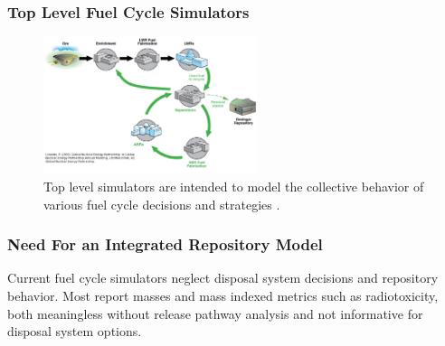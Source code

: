 

\begin{frame}[ctb!]
  \frametitle{Top Level Fuel Cycle Simulators}
  \begin{figure}[htbp!]
    \begin{center}
      \includegraphics[height=4cm]{simulations.eps}
    \end{center}
    \caption{Top level simulators are intended to model the collective 
    behavior of various fuel cycle decisions and 
    strategies \cite{lisowski_global_2007}.}
    \label{fig:simulation}
  \end{figure}
\end{frame}

\begin{frame}[ctb!]
  \frametitle{Need For an Integrated Repository Model}
  Current fuel cycle simulators neglect disposal system decisions and 
  repository behavior. Most report masses and mass indexed metrics such 
  as radiotoxicity, both meaningless without release pathway analysis
  and not informative for disposal system options.

  

\end{frame}

